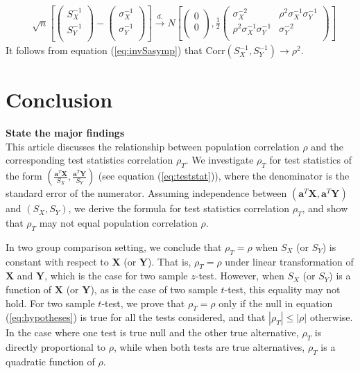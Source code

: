 \documentclass[12pt, a4paper]{article}
\newcommand{\cor}{\text{Corr}}
\begin{document}
		\begin{equation}\label{eq:invSasymp}
		\begin{aligned}
		& \sqrt{n}\left[\left( \begin{array}{c}
		S_X^{-1}\\
		S_Y^{-1}\\
		\end{array}\right)
		-
		\left( \begin{array}{c}
		\sigma_X^{-1}\\
		\sigma_Y^{-1}\\
		\end{array}\right)
		\right]
		\stackrel{d.}{\longrightarrow} 
		N\left[
		\left(\begin{array}{c}
		0\\
		0\\
		\end{array} \right), 
		\frac{1}{2}\left(
		\begin{array}{cc}
		\sigma_X^{-2} &\rho^2\sigma_X^{-1}\sigma_Y^{-1} \\
		\rho^2\sigma_X^{-1}\sigma_Y^{-1}  &\sigma_Y^{-2} \\
		\end{array}
		\right)
		\right] 
		\end{aligned}
		\end{equation}
	It follows from equation (\ref{eq:invSasymp}) that $\cor(S_X^{-1}, S_Y^{-1}) \rightarrow \rho^2$.
	
	
	
	\section{Conclusion}
	
	\textbf{State the major findings} \\
	This article discusses the relationship between population correlation $\rho$ and the 
	corresponding test statistics correlation $\rho_T$. We investigate $\rho_T$ for test statistics 
	of the form $(\frac{\bm a^T\bm X}{S_X}, \frac{\bm a^T\bm Y}{S_Y})$ (see equation 
	(\ref{eq:teststat})), where the denominator is the standard error of the numerator. Assuming 
	independence between $(\bm a^T\bm X, \bm a^T\bm Y)$ and $(S_X, S_Y)$, we derive the formula for 
	test statistics correlation $\rho_T$, and show that $\rho_T$ may not equal population 
	correlation $\rho$.  
	
	In two group comparison setting, we conclude that $\rho_T = \rho$ when $S_X$ (or $S_Y$) is 
	constant with respect to $\bm X$ (or $\bm Y$). That is, $\rho_T = \rho$ under linear 
	transformation of $\bm X$ and $\bm Y$, which is the case for two sample $z$-test. However, when 
	$S_X$ (or $S_Y$) is a function of $\bm X$ (or $\bm Y$), as is the case of two
	sample $t$-test, this equality may not hold. For two sample $t$-test, we prove that 
	$\rho_T=\rho$ only if the null in equation (\ref{eq:hypotheses}) is true for all the tests 
	considered, and that $|\rho_T|\leq |\rho|$ otherwise. In the case where one test is true null 
	and the other true alternative, $\rho_T$ is directly proportional to $\rho$, while when both 
	tests are true alternatives, $\rho_T$ is a quadratic function of $\rho$.
	
\end{document}
